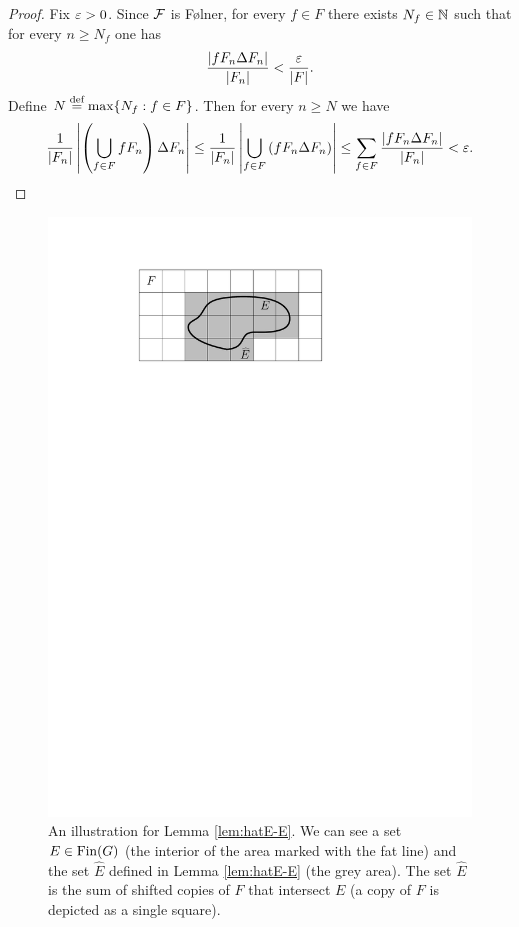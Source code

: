 \begin{proof}
Fix $\varepsilon>0$. Since $\operatorname{\mathcal{F}}$ is F{\o}lner, for every $f\in F$ there exists $N_f\in\mathbb{N}$ such that for every $n\geq N_f$ one has
\[
\frac{|fF_n\Delta F_n|}{|F_n|}<\frac{\varepsilon}{|F|}.
\]
Define $N\stackrel{\textup{def}}{=} \max\{N_f: f\in F\}$. Then for every $n\geq N$ we have
\[
\frac{1}{|F_n|}\left|\left(\bigcup_{f\in F}fF_n\right)\Delta F_n\right|\leq \frac{1}{|F_n|}\left|\bigcup_{f\in F}\left(fF_n\Delta F_n\right)\right|\leq\sum_{f\in F}\frac{\left|fF_n\Delta F_n\right|}{|F_n|}<\varepsilon. \qedhere
\]
\end{proof}



\begin{figure}\label{fig:F-hull}
\centering
\includegraphics[scale=1]{../Graphics/E_hat_densities}
\caption{An illustration for Lemma \ref{lem:hatE-E}. We can see a set $E\in\operatorname{Fin}(G)$ (the interior of the area marked with the fat line) and the set $\widehat E$ defined in Lemma \ref{lem:hatE-E}  (the grey area). The set $\widehat E$ is the sum of shifted copies of $F$ that intersect $E$ (a copy of $F$ is depicted as a single square). }
\end{figure}

